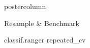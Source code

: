 \documentclass{beamer}
\begin{document}
\begin{frame}[fragile]{}
\begin{columns}
\begin{column}{.245\textwidth}
\begin{beamercolorbox}[center]{postercolumn}
\begin{minipage}{.98\textwidth}
{\begin{myblock}{Resample \& Benchmark}
\begin{codeboxmultiline}[width=27cm]
{								classif.ranger
								\space\space repeated\_cv
								\space{}
								\space\space\space\space\space\space\space 0
								\space\space\space\space{}
							}
						\end{codeboxmultiline}
						\end{myblock}\vfill
					}
				\end{minipage}
			\end{beamercolorbox}
		\end{column}
	\end{columns}
\end{frame}
\end{document}
